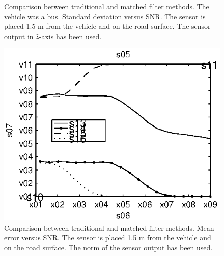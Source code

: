 \begin{subfigures}
\begin{figure}[!tbh]
\begin{minipage}{0.45\linewidth}
  \caption[Time difference, method comparison. Error standard deviation. $\hat{z}$-axis. (Bus)]{Comparison between traditional and matched filter methods. The vehicle was a bus. Standard deviation versus SNR. The sensor is placed 1.5 m from the vehicle and on the road surface. The sensor output in $\hat{z}$-axis has been used.}
  \label{fig:comp_std_z_bus}
  \end{minipage}
 \end{figure}
\end{subfigures}

\begin{subfigures}
\begin{figure}[!tbh]
  \centering
  \begin{minipage}{0.45\linewidth}
  \centering
  
   \includegraphics[width=\linewidth]{images/mean_error_r}
  \caption[Time difference, method comparison. Mean error. Norm.]{Comparison between traditional and matched filter methods. Mean error versus SNR. The sensor is placed 1.5 m from the vehicle and on the road surface. The norm of the sensor output has been used.}
  \label{fig:comp_mean_r}
  \end{minipage}\hfill
  \begin{minipage}{0.45\linewidth}
   \centering
   

\end{minipage}
\end{figure}
\end{subfigures}
